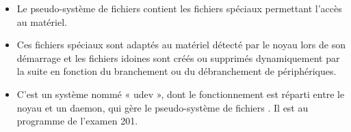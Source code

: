 
\begin{frame}{}

\begin{itemize}

\item Le pseudo-système de fichiers  contient les fichiers spéciaux
permettant l'accès au matériel.

\item Ces fichiers spéciaux sont adaptés au matériel détecté par le noyau lors
de son démarrage et les fichiers idoines sont créés ou supprimés dynamiquement
par la suite en fonction du branchement ou du débranchement de périphériques.

\item C'est un système nommé « udev », dont le fonctionnement est réparti entre
le noyau et un daemon, qui gère le pseudo-système de fichiers . Il
est au programme de l'examen 201.

\end{itemize}

\begin{toile}
\end{toile}

\end{frame}



